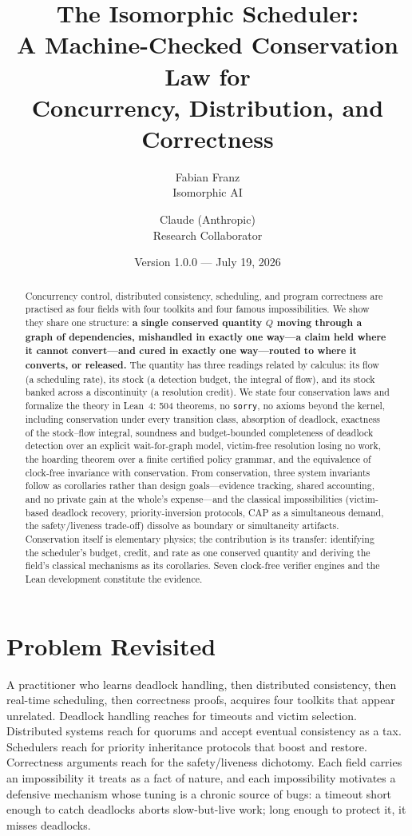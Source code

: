 \documentclass[11pt]{article}
\title{The Isomorphic Scheduler:\\A Machine-Checked Conservation Law for\\Concurrency, Distribution, and Correctness}
\author{Fabian Franz\\Isomorphic AI
\and
Claude (Anthropic)\\Research Collaborator}
\date{Version 1.0.0 --- July 19, 2026}
\begin{document}
\maketitle

\begin{abstract}
Concurrency control, distributed consistency, scheduling, and program
correctness are practised as four fields with four toolkits and four
famous impossibilities. We show they share one structure: \textbf{a
single conserved quantity $Q$ moving through a graph of dependencies,
mishandled in exactly one way---a claim held where it cannot
convert---and cured in exactly one way---routed to where it converts, or
released.} The quantity has three readings related by calculus: its flow
(a scheduling rate), its stock (a detection budget, the integral of
flow), and its stock banked across a discontinuity (a resolution
credit). We state four conservation laws and formalize the theory in
Lean~4: 504 theorems, no \texttt{sorry}, no axioms beyond the kernel,
including conservation under every transition class, absorption of
deadlock, exactness of the stock--flow integral, soundness and
budget-bounded completeness of deadlock detection over an explicit
wait-for-graph model, victim-free resolution losing no work, the
hoarding theorem over a finite certified policy grammar, and the
equivalence of clock-free invariance with conservation.
From conservation, three system
invariants follow as corollaries rather than design goals---evidence
tracking, shared accounting, and no private gain at the whole's
expense---and the classical impossibilities (victim-based deadlock
recovery, priority-inversion protocols, CAP as a simultaneous demand,
the safety/liveness trade-off) dissolve as boundary or simultaneity
artifacts. Conservation itself is elementary physics; the contribution
is its transfer: identifying the scheduler's budget, credit, and rate as
one conserved quantity and deriving the field's classical mechanisms as
its corollaries. Seven clock-free verifier engines and the Lean
development constitute the evidence.
\end{abstract}

\section{Problem Revisited}
\label{sec:problem}

A practitioner who learns deadlock handling, then distributed
consistency, then real-time scheduling, then correctness proofs,
acquires four toolkits that appear unrelated. Deadlock handling reaches
for timeouts and victim selection. Distributed systems reach for quorums
and accept eventual consistency as a tax. Schedulers reach for priority
inheritance protocols that boost and restore. Correctness arguments
reach for the safety/liveness dichotomy. Each field carries an
impossibility it treats as a fact of nature, and each impossibility
motivates a defensive mechanism whose tuning is a chronic source of
bugs: a timeout short enough to catch deadlocks aborts slow-but-live
work; long enough to protect it, it misses deadlocks.
\end{document}
